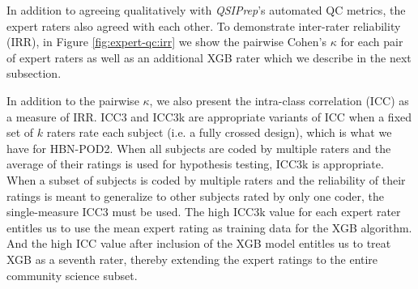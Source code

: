 \documentclass[fleqn,10pt]{wlscirep}
\begin{document}
In addition to agreeing qualitatively with \emph{QSIPrep}'s automated QC
metrics, the expert raters also agreed with each other. To demonstrate
inter-rater reliability (IRR), in Figure \ref{fig:expert-qc:irr} we show the
pairwise Cohen's $\kappa$ \cite{di-eugenio2004-bb} for each pair of expert
raters as well as an additional XGB rater which we describe in the next
subsection.

In addition to the pairwise $\kappa$, we also present the intra-class
correlation (ICC) \cite{hallgren2012-ze} as a measure of IRR.  ICC3 and ICC3k
are appropriate variants of ICC when a fixed set of $k$ raters rate each subject
(i.e. a fully crossed design), which is what we have for HBN-POD2. When all
subjects are coded by multiple raters and the average of their ratings is used
for hypothesis testing, ICC3k is appropriate.  When a subset of subjects is
coded by multiple raters and the reliability of their ratings is meant to
generalize to other subjects rated by only one coder, the single-measure ICC3
must be used. The high ICC3k value for each expert rater entitles us to use the
mean expert rating as training data for the XGB algorithm.  And the high ICC
value after inclusion of the XGB model entitles us to treat XGB as a seventh
rater, thereby extending the expert ratings to the entire community science
subset.
\end{document}
